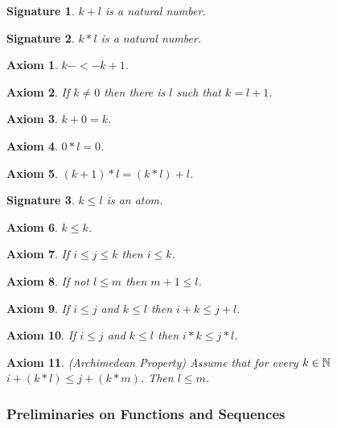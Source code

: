 \documentclass[12pt]{article}
\newtheorem{signature}{Signature}
\newtheorem{axiom}{Axiom}
\newcommand{\NN}{{\Bbb N}}
\begin{document}
\begin{signature} $k + l$ is a natural number.
\end{signature}

\begin{signature} $k * l$ is a natural number.
\end{signature}

\begin{axiom} $k -<- k + 1$.
\end{axiom}

\begin{axiom} If $k \neq 0$ then there is $l$ 
such that $k = l + 1$.
\end{axiom}

\begin{axiom} $k + 0 = k$.
\end{axiom}

\begin{axiom} $0 * l = 0$.
\end{axiom}

\begin{axiom} $(k + 1) * l = (k * l) + l$. 
\end{axiom}

\begin{signature} $k \leq l$ is an atom.
\end{signature}

\begin{axiom} $k \leq k$.
\end{axiom}

\begin{axiom} If $i \leq j \leq k$ then $i \leq k$.
\end{axiom}

\begin{axiom} If not $l \leq m$ then $m +1 \leq l$.
\end{axiom} 

\begin{axiom} If $i \leq j$ and $k \leq l$ then $i + k \leq j + l$.
\end{axiom}

\begin{axiom} If $i \leq j$ and $k \leq l$ then $i * k \leq j * l$.
\end{axiom}

\begin{axiom} (Archimedean Property) Assume that for every 
$k \in \NN$
$i + (k * l) \leq j + (k * m)$. Then $l \leq m$.
\end{axiom}

\subsubsection{Preliminaries on Functions and Sequences}
\end{document}
